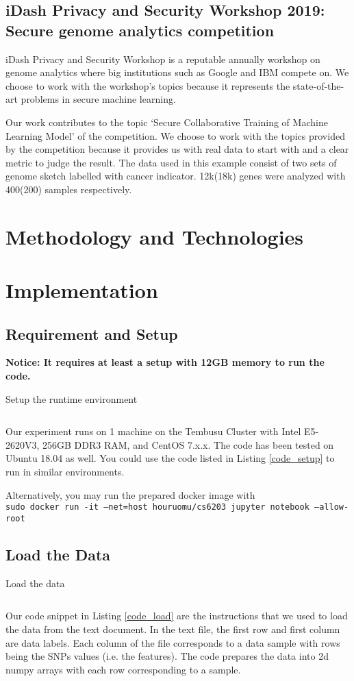 \documentclass[a4paper,12pt]{article}
\begin{document}
\subsection{iDash Privacy and Security Workshop 2019: Secure genome analytics competition}
iDash Privacy and Security Workshop is a reputable annually workshop on genome analytics where big institutions such as Google and IBM compete on. We choose to work with the workshop's topics because it represents the state-of-the-art problems in secure machine learning. 

Our work contributes to the topic `Secure Collaborative Training of Machine Learning Model' of the competition. We choose to work with the topics provided by the competition because it provides us with real data to start with and a clear metric to judge the result. The data used in this example consist of two sets of genome sketch labelled with cancer indicator. 12k(18k) genes were analyzed with 400(200) samples respectively. 
\section{Methodology and Technologies}

\section{Implementation}
\subsection{Requirement and Setup}
\textbf{Notice: It requires at least a setup with 12GB memory to run the code.}

\begin{listing}[H]
	\caption{Setup the runtime environment}
	\inputminted[frame=single,framesep=10pt,linenos]{bash}{1_prep.sh}
	\label{code_setup}
\end{listing}

Our experiment runs on 1 machine on the Tembusu Cluster with Intel E5-2620V3, 256GB DDR3 RAM, and CentOS 7.x.x. The code has been tested on Ubuntu 18.04 as well. You could use the code listed in Listing \ref{code_setup} to run in similar environments.  

Alternatively, you may run the prepared docker image with\\
\texttt{sudo docker run -it --net=host houruomu/cs6203 jupyter notebook --allow-root}

\subsection{Load the Data}
\begin{listing}[H]
	\caption{Load the data}
	\inputminted[frame=single,framesep=10pt,linenos]{python3}{load_data.py}
	\label{code_load}
\end{listing}
Our code snippet in Listing \ref{code_load} are the instructions that we used to load the data from the text document. In the text file, the first row and first column are data labels. Each column of the file corresponds to a data sample with rows being the SNPs values (i.e. the features). The code prepares the data into 2d numpy arrays with each row corresponding to a sample.
\end{document}
